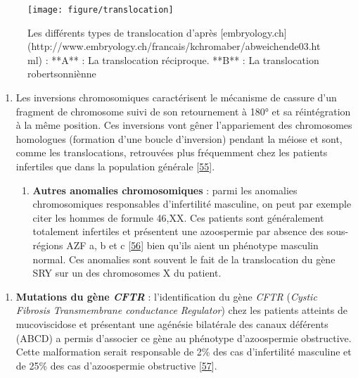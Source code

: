 \documentclass[12pt,twoside]{reedthesis}
\providecommand{\tightlist}{%
  \setlength{\itemsep}{0pt}\setlength{\parskip}{0pt}}
\theoremstyle{definition}
\theoremstyle{definition}
\theoremstyle{remark}
\begin{document}
  \begin{figure}
  
  {\centering \texttt{[image: figure/translocation]} 
  
  }
  
  \caption[Les différents types de translocation]{Les différents types de translocation d'après [embryology.ch](http://www.embryology.ch/francais/kchromaber/abweichende03.html) :  **A** : La translocation réciproque. **B** : La translocation robertsonniènne}\label{fig:figtranslocation}
  \end{figure}
  
  \begin{enumerate}
  \def\labelenumi{\roman{enumi}.}
  \setcounter{enumi}{1}
  \item
    Les inversions chromosomiques caractérisent le mécanisme de cassure
    d'un fragment de chromosome suivi de son retournement à 180° et sa
    réintégration à la même position. Ces inversions vont gêner
    l'appariement des chromosomes homologues (formation d'une boucle
    d'inversion) pendant la méiose et sont, comme les translocations,
    retrouvées plus fréquemment chez les patients infertiles que dans la
    population générale {[}\protect\hyperlink{ref-Krausz2000}{55}{]}.
  
    \begin{enumerate}
    \def\labelenumii{\alph{enumii}.}
    \setcounter{enumii}{2}
    \tightlist
    \item
      \textbf{Autres anomalies chromosomiques} : parmi les anomalies
      chromosomiques responsables d'infertilité masculine, on peut par
      exemple citer les hommes de formule 46,XX. Ces patients sont
      généralement totalement infertiles et présentent une azoospermie par
      absence des sous- régions AZF a, b et c
      {[}\protect\hyperlink{ref-Vorona2007}{56}{]} bien qu'ils aient un
      phénotype masculin normal. Ces anomalies sont souvent le fait de la
      translocation du gène SRY sur un des chromosomes X du patient.
    \end{enumerate}
  \end{enumerate}
  
  \begin{enumerate}
  \def\labelenumi{\arabic{enumi}.}
  \setcounter{enumi}{2}
  \tightlist
  \item
    \textbf{Mutations du gène \emph{CFTR} }: l'identification du gène
    \emph{CFTR} (\emph{Cystic Fibrosis Transmembrane conductance
    Regulator}) chez les patients atteints de mucoviscidose et présentant
    une agénésie bilatérale des canaux déférents (ABCD) a permis
    d'associer ce gène au phénotype d'azoospermie obstructive. Cette
    malformation serait responsable de 2\% des cas d'infertilité masculine
    et de 25\% des cas d'azoospermie obstructive
    {[}\protect\hyperlink{ref-Yu2012}{57}{]}.
  \end{enumerate}
  
\end{document}
